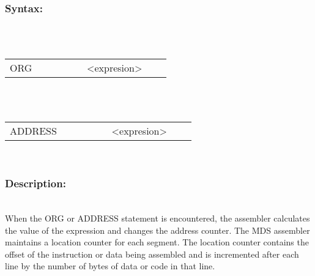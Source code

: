         \subsubsection{Syntax:}\\
        \\ {
                \texttt{}
                \begin{tabular}[h!]{llll}
                        { \color{highlight_directive} ORG } & \verb'         '
                        { \color{highlight_constant} <expresion> } & { \color{highlight_comment}  }\\
                \end{tabular}
            }\\
        \\ {
                \texttt{}
                \begin{tabular}[h!]{llll}
                        { \color{highlight_directive} ADDRESS } & \verb'         '
                        { \color{highlight_constant} <expresion> } & { \color{highlight_comment}  }\\
                \end{tabular}
            }\\
        \subsubsection{Description:}\\
        When the ORG or ADDRESS statement is encountered, the assembler calculates the value of the expression and changes the address counter.
        The MDS assembler maintains a location counter for each segment. The location counter contains the offset of the instruction or data
        being assembled and is incremented after each line by the number of bytes of data or code in that line.
